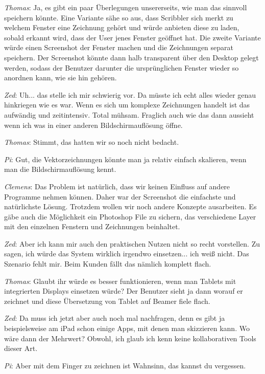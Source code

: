 \medskip \emph{Thomas}: Ja, es gibt ein paar Überlegungen unsererseits, wie man das sinnvoll speichern könnte. Eine Variante sähe so aus, dass Scribbler sich merkt zu welchem Fenster eine Zeichnung gehört und würde anbieten diese zu laden, sobald erkannt wird, dass der User jenes Fenster geöffnet hat. Die zweite Variante würde einen Screenshot der Fenster machen und die Zeichnungen separat speichern. Der Screenshot könnte dann halb transparent über den Desktop gelegt werden, sodass der Benutzer darunter die ursprünglichen Fenster wieder so anordnen kann, wie sie hin gehören.

\medskip \emph{Zed}: Uh... das stelle ich mir schwierig vor. Da müsste ich echt alles wieder genau hinkriegen wie es war. Wenn es sich um komplexe Zeichnungen handelt ist das aufwändig und zeitintensiv. Total mühsam. Fraglich auch wie das dann aussieht wenn ich was in einer anderen Bildschirmauflösung öffne.

\medskip \emph{Thomas}: Stimmt, das hatten wir so noch nicht bedacht.

\medskip \emph{Pi}: Gut, die Vektorzeichnungen könnte man ja relativ einfach skalieren, wenn man die Bildschirmauflösung kennt.

\medskip \emph{Clemens}: Das Problem ist natürlich, dass wir keinen Einfluss auf andere Programme nehmen können. Daher war der Screenshot die einfachste und natürlichste Lösung. Trotzdem wollen wir noch andere Konzepte ausarbeiten. Es gäbe auch die Möglichkeit ein Photoshop File zu sichern, das verschiedene Layer mit den einzelnen Fenstern und Zeichnungen beinhaltet.

\medskip \emph{Zed}: Aber ich kann mir auch den praktischen Nutzen nicht so recht vorstellen. Zu sagen, ich würde das System wirklich irgendwo einsetzen... ich weiß nicht. Das Szenario fehlt mir. Beim Kunden fällt das nämlich komplett flach.

\medskip \emph{Thomas}: Glaubt ihr würde es besser funktionieren, wenn man Tablets mit integrierten Displays einsetzen würde? Der Benutzer sieht ja dann worauf er zeichnet und diese Übersetzung von Tablet auf Beamer fiele flach.

\medskip \emph{Zed}: Da muss ich jetzt aber auch noch mal nachfragen, denn es gibt ja beispielsweise am iPad schon einige Apps, mit denen man skizzieren kann. Wo wäre dann der Mehrwert? Obwohl, ich glaub ich kenn keine kollaborativen Tools dieser Art.

\medskip \emph{Pi}: Aber mit dem Finger zu zeichnen ist Wahnsinn, das kannst du vergessen.

